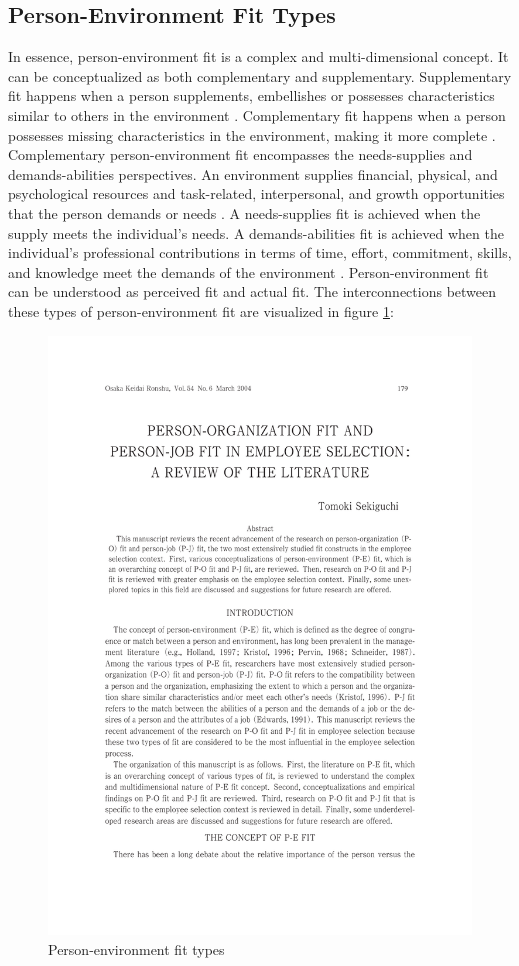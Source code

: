 \documentclass[draft,final]{thesisclass} %
\begin{document}
\subsection{Person-Environment Fit Types} \label{pef_types}
In essence, person-environment fit is a complex and multi-dimensional concept.
It can be conceptualized as both complementary and supplementary. 
Supplementary fit happens when a person supplements, embellishes or possesses characteristics similar to others in the environment \parencite[180]{po_and_pj_fit_literature_review}.
Complementary fit happens when a person possesses missing characteristics in the environment, making it more complete \parencite[180]{po_and_pj_fit_literature_review}.
Complementary person-environment fit encompasses the needs-supplies and demands-abilities perspectives. 
An environment supplies financial, physical, and psychological resources and task-related, interpersonal, and growth opportunities that the person demands or needs \parencite[180]{po_and_pj_fit_literature_review}.
A needs-supplies fit is achieved when the supply meets the individual's needs.
A demands-abilities fit is achieved when the individual's professional contributions in terms of time, effort, commitment, skills, and knowledge meet the demands of the environment \parencite[180]{po_and_pj_fit_literature_review}.
Person-environment fit can be understood as perceived fit and actual fit.
The interconnections between these types of person-environment fit are visualized in figure \ref{fig:person_environment_fit_types}:
\begin{figure}[H]
    \centering
    \includegraphics[scale=0.5,page=3,width=0.8\linewidth,trim={55 130 55 470},clip]{literature/po_and_pj_fit_literature_review.pdf}
    \caption{Person-environment fit types \parencite[3]{po_and_pj_fit_literature_review}}
    \label{fig:person_environment_fit_types}
\end{figure}
\end{document}
